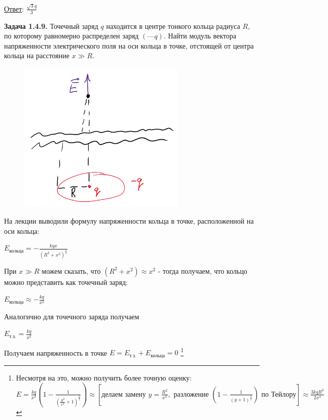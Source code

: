 \underline{Ответ}: $\frac{\sqrt{3}q}{3}$


\clearpage

\begin{tcolorbox}
    \textbf{Задача 1.4.9.} Точечный заряд $q$ находится в центре тонкого
    кольца радиуса $R$, по которому равномерно распределен заряд $(—q)$.
    Найти модуль вектора напряженности электрического поля на оси
    кольца в точке, отстоящей от центра кольца на расстояние $x \gg R$.
\end{tcolorbox}

\begin{minipage}{\textwidth}
    \begin{figure}
        \includegraphics[width=8cm]{physics1/images/physics1_homework_6_2}
    \end{figure}

    На лекции выводили формулу напряженности кольца в точке, расположенной на оси кольца: 

    $E_{\text{кольца}} = -\frac{kqx}{(R^2 + x^2)^{\frac{3}{2}}}$

    При $x \gg R$ можем сказать, что $(R^2 + x^2) \approx x^2$ - тогда получаем, что кольцо можно представить как точечный заряд:

    $E_{\text{кольца}} \approx -\frac{kq}{x^2}$

    Аналогично для точечного заряда получаем 
    
    $E_{\text{т.з.}} = \frac{kq}{x^2}$
\end{minipage}

Получаем напряженность в точке $E = E_{\text{т.з.}} + E_{\text{кольца}} = 0$
\footnote{Несмотря на это, можно получить более точную оценку: \\
$E = \frac{kq}{x^2} \left(1 - \frac{1}{\left(\frac{R^2}{x^2} + 1\right)^{\frac{3}{2}}}\right) \approx \left[\text{делаем замену } y = \frac{R^2}{x^2}, \text{ разложение } \left(1 - \frac{1}{(y + 1)^{\frac{3}{2}}}\right) \text{ по Тейлору}\right] \approx \frac{3kqR^2}{2x^4}$}

